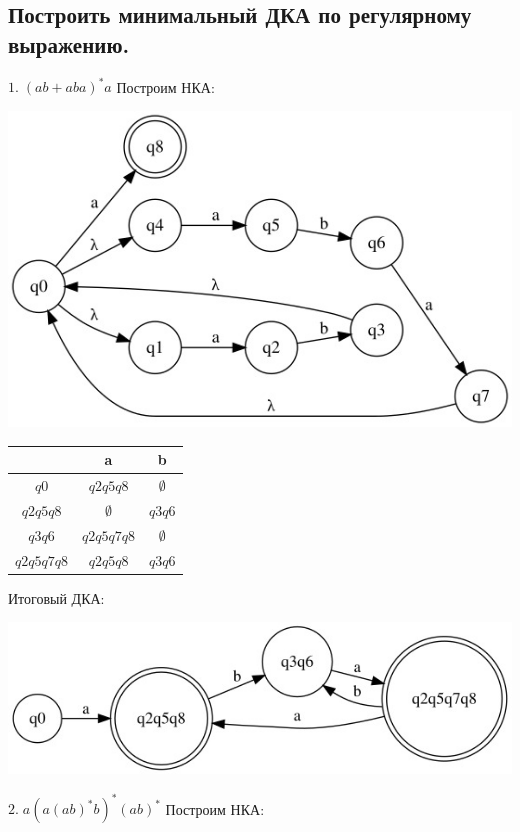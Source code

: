 \documentclass[a4paper,12pt]{article}
\begin{document}
\subsection*{Построить минимальный ДКА по регулярному выражению.}
\Large $1.\;(ab+aba)^*a$\newline
Построим НКА:
\begin{center}
\includegraphics{3_1_nka}\newline
\end{center}
\begin{center}
\begin{tabular}{ |c|c|c| } 
\hline
  & a & b \\ [0.5ex] 
 \hline
$q0$ & $q2q5q8$ & $\emptyset$ \\
$q2q5q8$ & $\emptyset$ & $q3q6$ \\
$q3q6$ & $q2q5q7q8$ & $\emptyset$ \\
$q2q5q7q8$ & $q2q5q8$ & $q3q6$ \\
 \hline
\end{tabular}
\end{center}
Итоговый ДКА:
\begin{center}
\includegraphics{3_1}\newline
\end{center}
\Large $2.\;a(a(ab)^*b)^*(ab)^*$\newline
Построим НКА:
\end{document}
